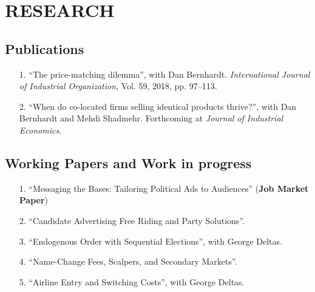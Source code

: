 \documentclass{article}
\begin{document}



\section{RESEARCH}
\subsection{Publications}
\begin{itemize}
    \item[1.] ``The price-matching dilemma'', with Dan Bernhardt. \emph{International Journal of Industrial Organization}, Vol. 59, 2018, pp. 97--113.
    \item[2.] ``When do co-located firms selling identical products thrive?'', with Dan Bernhardt and Mehdi Shadmehr. Forthcoming at \emph{Journal of Industrial Economics}.
\end{itemize}


\subsection{Working Papers and Work in progress}
\begin{itemize}
    \item[1.] ``Messaging the Bases: Tailoring Political Ads to Audiences'' ({\bf Job Market Paper})
    \item[2.] ``Candidate Advertising Free Riding and Party Solutions''.
    \item[3.] ``Endogenous Order with Sequential Elections'', with George Deltas.
    \item[4.] ``Name-Change Fees, Scalpers, and Secondary Markets''.
    \item[5.] ``Airline Entry and Switching Costs'', with George Deltas.
    \end{itemize}
\end{document}
